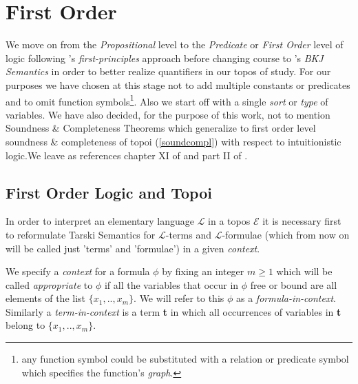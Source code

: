 \section{First Order}
\label{chapter4}

We move on from the \emph{Propositional} level to the \emph{Predicate} or \emph{First Order} level of logic following \cite{goldblatt}'s \emph{first-principles} approach before changing course to \cite{lambekscott}'s \emph{BKJ Semantics} in order to better realize quantifiers in our topos of study.\newline
For our purposes we have chosen at this stage not to add multiple constants or predicates and to omit function symbols\footnote{any function symbol could be substituted with a relation or predicate symbol which specifies the function's \emph{graph}.}. Also we start off with a single \emph{sort} or \emph{type} of variables.\newline
\newline
We have also decided, for the purpose of this work, not to mention Soundness \& Completeness Theorems which generalize to first order level soundness \& completeness of topoi (\ref{soundcompl}) with respect to intuitionistic logic.\newline We leave as references chapter XI of \cite{goldblatt} and part II of \cite{lambekscott}. 


\newpage
\subsection{First Order Logic and Topoi}

In order to interpret an elementary language $\mathcal{L}$ in a topos $\mathcal{E}$ it is necessary first to reformulate Tarski Semantics for $\mathcal{L}$-terms and $\mathcal{L}$-formulae (which from now on will be called just 'terms' and 'formulae') in a given \emph{context}.
\begin{definition}
	We specify a \emph{context} for a formula $\phi$ by fixing an integer $m \geq 1$ which will be called \emph{appropriate} to $\phi$ if all the variables that occur in $\phi$ free or bound are all elements of the list $\{x_1,..,x_m\}$. We will refer to this $\phi$ as a \emph{formula-in-context}. \newline
	Similarly a \emph{term-in-context}  is a term \textbf{t} in which all occurrences of variables in \textbf{t} belong to $\{x_1,..,x_m\}$. 
\end{definition}

